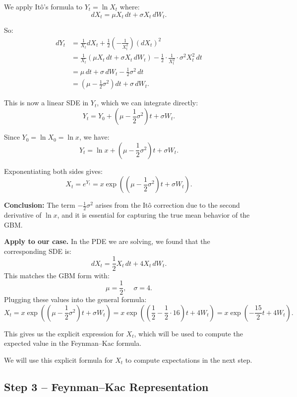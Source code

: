 We apply Itô's formula to \( Y_t = \ln X_t \) where:
\[
dX_t = \mu X_t\,dt + \sigma X_t\,dW_t.
\]

So:
\[
\begin{aligned}
dY_t &= \frac{1}{X_t} dX_t + \frac{1}{2} \left(-\frac{1}{X_t^2}\right) (dX_t)^2 \\
     &= \frac{1}{X_t} (\mu X_t\,dt + \sigma X_t\,dW_t) - \frac{1}{2} \cdot \frac{1}{X_t^2} \cdot \sigma^2 X_t^2\,dt \\
     &= \mu\,dt + \sigma\,dW_t - \frac{1}{2} \sigma^2\,dt \\
     &= \left( \mu - \frac{1}{2} \sigma^2 \right) dt + \sigma\,dW_t.
\end{aligned}
\]

This is now a linear SDE in \( Y_t \), which we can integrate directly:
\[
Y_t = Y_0 + \left( \mu - \frac{1}{2} \sigma^2 \right)t + \sigma W_t.
\]

Since \( Y_0 = \ln X_0 = \ln x \), we have:
\[
Y_t = \ln x + \left( \mu - \frac{1}{2} \sigma^2 \right)t + \sigma W_t.
\]

Exponentiating both sides gives:
\[
X_t = e^{Y_t} = x \exp\left( \left( \mu - \frac{1}{2} \sigma^2 \right)t + \sigma W_t \right).
\]

\textbf{Conclusion:}  
The term \( -\frac{1}{2} \sigma^2 \) arises from the Itô correction due to the second derivative of \( \ln x \), and it is essential for capturing the true mean behavior of the GBM.

\textbf{Apply to our case.}  
In the PDE we are solving, we found that the corresponding SDE is:
\[
dX_t = \frac{1}{2} X_t\,dt + 4 X_t\,dW_t.
\]
This matches the GBM form with:
\[
\mu = \frac{1}{2}, \quad \sigma = 4.
\]
Plugging these values into the general formula:
\[
X_t = x \exp\left( \left( \mu - \frac{1}{2} \sigma^2 \right)t + \sigma W_t \right)
= x \exp\left( \left( \frac{1}{2} - \frac{1}{2} \cdot 16 \right)t + 4W_t \right)
= x \exp\left( -\frac{15}{2}t + 4W_t \right).
\]

This gives us the explicit expression for \( X_t \), which will be used to compute the expected value in the Feynman–Kac formula.

We will use this explicit formula for \( X_t \) to compute expectations in the next step.

\subsection*{Step 3 – Feynman–Kac Representation}

